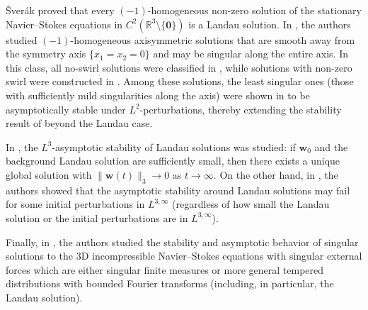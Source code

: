 \documentclass[10pt]{amsart}
\theoremstyle{plain}
\theoremstyle{definition}
\theoremstyle{remark}
\numberwithin{equation}{section}
\begin{document}
\v{S}ver\'{a}k \cite{Sverak2011} proved that every $(-1)$-homogeneous non-zero solution of the stationary Navier--Stokes equations in $C^2(\mathbb{R}^3\setminus\{\mathbf0\})$ is a Landau solution.  
In \cite{LLY18I,LLY18II,LLY19III}, the authors studied $(-1)$-homogeneous axisymmetric solutions that are smooth away from the symmetry axis $\{x_1 = x_2 = 0\}$ and may be singular along the entire axis. In this class, all no-swirl solutions were classified in \cite{LLY18I,LLY18II}, while solutions with non-zero swirl were constructed in \cite{LLY18I,LLY19III}.  Among these solutions, the least singular ones (those with sufficiently mild singularities along the axis) were shown in \cite{LiYan2021} to be asymptotically stable under $L^2$-perturbations, thereby extending the stability result of \cite{KarchPilarczyk2011} beyond the Landau case.  

In \cite{LZZ23}, the $L^3$-asymptotic stability of Landau solutions was studied:  if $\boldsymbol{w}_0$ and the background Landau solution are sufficiently small, then there exists a unique global solution with $\|\boldsymbol{w}(t)\|_{3} \to 0$ as $t \to \infty$.   On the other hand, in \cite{zbMATH08070132}, the authors showed that the asymptotic stability around Landau solutions may fail for some initial perturbations in $L^{3,\infty}$ (regardless of how small the Landau solution or the initial perturbations are in $L^{3,\infty}$). 

Finally, in \cite{zbMATH07471753}, the authors studied the stability and asymptotic behavior of singular solutions to the 3D incompressible Navier--Stokes equations with singular external forces which are either singular finite measures or more general tempered distributions
with bounded Fourier transforms (including, in particular, the Landau solution).
\end{document}
